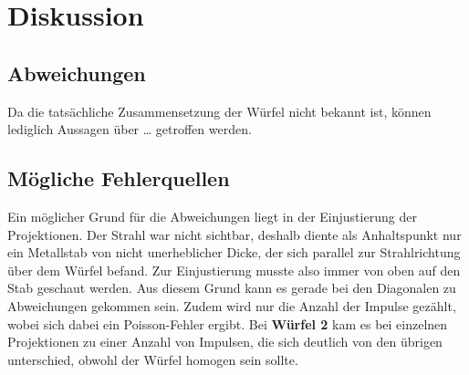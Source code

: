 \section{Diskussion}
\label{sec:diskussion}

\subsection{Abweichungen}
    Da die tatsächliche Zusammensetzung der Würfel nicht bekannt ist,
    können lediglich Aussagen über … getroffen werden.


\subsection{Mögliche Fehlerquellen}

    Ein möglicher Grund für die Abweichungen liegt in der Einjustierung der Projektionen.
    Der Strahl war nicht sichtbar,
    deshalb diente als Anhaltspunkt nur ein Metallstab von nicht unerheblicher Dicke,
    der sich parallel zur Strahlrichtung über dem Würfel befand.
    Zur Einjustierung musste also immer von oben auf den Stab geschaut werden.
    Aus diesem Grund kann es gerade bei den Diagonalen zu Abweichungen gekommen sein.
    Zudem wird nur die Anzahl der Impulse gezählt,
    wobei sich dabei ein Poisson-Fehler ergibt.
    Bei \textbf{Würfel 2} kam es bei einzelnen Projektionen zu einer Anzahl von Impulsen,
    die sich deutlich von den übrigen unterschied,
    obwohl der Würfel homogen sein sollte.

